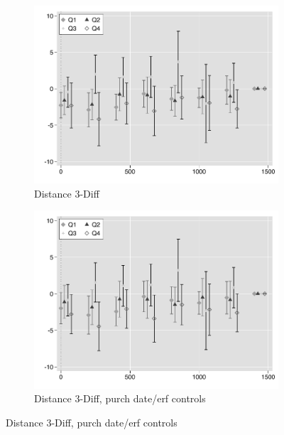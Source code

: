 \documentclass[12pt]{article}
\begin{document}
\begin{figure}
        \centering
        \begin{subfigure}[b]{0.48\textwidth}
                    \caption[Network2]%
            {{\footnotesize Distance 3-Diff}}    
            \label{fig:prefor}
            \centering
            \includegraphics[width=\textwidth,trim={0.3cm .3cm 0.1cm 0cm}, clip=true]{figures/freq_dist_3d_no_ctrl_q}
        \end{subfigure}
        \hfill
        \begin{subfigure}[b]{0.48\textwidth}
                    \caption[Network2]%
            {{\footnotesize Distance 3-Diff, purch date/erf controls}}    
            \label{fig:prefor}
            \centering
            \includegraphics[width=\textwidth,trim={0.3cm .3cm 0.1cm 0cm}, clip=true]{figures/freq_dist_3d_ctrl_q}

\end{subfigure}
\end{figure}
\end{document}
